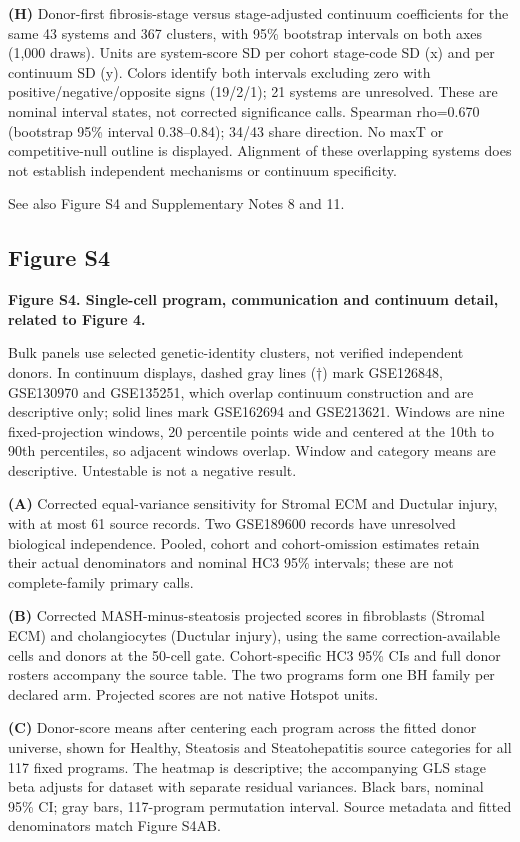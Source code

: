 \textbf{(H)} Donor-first fibrosis-stage versus stage-adjusted continuum coefficients for the same 43 systems and 367 clusters, with 95\% bootstrap intervals on both axes (1,000 draws). Units are system-score SD per cohort stage-code SD (x) and per continuum SD (y). Colors identify both intervals excluding zero with positive/negative/opposite signs (19/2/1); 21 systems are unresolved. These are nominal interval states, not corrected significance calls. Spearman rho=0.670 (bootstrap 95\% interval 0.38--0.84); 34/43 share direction. No maxT or competitive-null outline is displayed. Alignment of these overlapping systems does not establish independent mechanisms or continuum specificity.

See also Figure S4 and Supplementary Notes 8 and 11.

\subsection{Figure S4}\label{figure-s4}

\textbf{Figure S4. Single-cell program, communication and continuum detail, related to Figure 4.}

Bulk panels use selected genetic-identity clusters, not verified independent donors. In continuum displays, dashed gray lines (†) mark GSE126848, GSE130970 and GSE135251, which overlap continuum construction and are descriptive only; solid lines mark GSE162694 and GSE213621. Windows are nine fixed-projection windows, 20 percentile points wide and centered at the 10th to 90th percentiles, so adjacent windows overlap. Window and category means are descriptive. Untestable is not a negative result.

\textbf{(A)} Corrected equal-variance sensitivity for Stromal ECM and Ductular injury, with at most 61 source records. Two GSE189600 records have unresolved biological independence. Pooled, cohort and cohort-omission estimates retain their actual denominators and nominal HC3 95\% intervals; these are not complete-family primary calls.

\textbf{(B)} Corrected MASH-minus-steatosis projected scores in fibroblasts (Stromal ECM) and cholangiocytes (Ductular injury), using the same correction-available cells and donors at the 50-cell gate. Cohort-specific HC3 95\% CIs and full donor rosters accompany the source table. The two programs form one BH family per declared arm. Projected scores are not native Hotspot units.

\textbf{(C)} Donor-score means after centering each program across the fitted donor universe, shown for Healthy, Steatosis and Steatohepatitis source categories for all 117 fixed programs. The heatmap is descriptive; the accompanying GLS stage beta adjusts for dataset with separate residual variances. Black bars, nominal 95\% CI; gray bars, 117-program permutation interval. Source metadata and fitted denominators match Figure S4AB.

